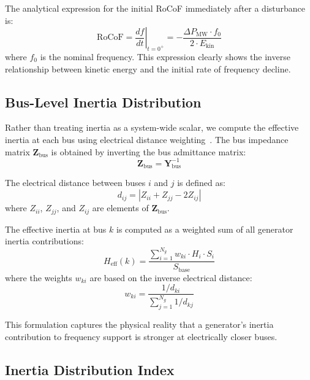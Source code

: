 \documentclass[]{ieeeaccess}
\begin{document}
The analytical expression for the initial RoCoF immediately after a disturbance is:
\begin{equation}
    \mathrm{RoCoF} = \left.\frac{df}{dt}\right|_{t=0^+} = -\frac{\Delta P_{\mathrm{MW}} \cdot f_0}{2 \cdot E_{\mathrm{kin}}}
    \label{eq:rocof}
\end{equation}
where $f_0$ is the nominal frequency. This expression clearly shows the inverse relationship between kinetic energy and the initial rate of frequency decline.

\subsection{Bus-Level Inertia Distribution}

Rather than treating inertia as a system-wide scalar, we compute the effective inertia at each bus using electrical distance weighting~\cite{tuo2021,li2024}. The bus impedance matrix $\mathbf{Z}_{\mathrm{bus}}$ is obtained by inverting the bus admittance matrix:
\begin{equation}
    \mathbf{Z}_{\mathrm{bus}} = \mathbf{Y}_{\mathrm{bus}}^{-1}
    \label{eq:zbus}
\end{equation}

The electrical distance between buses $i$ and $j$ is defined as:
\begin{equation}
    d_{ij} = |Z_{ii} + Z_{jj} - 2Z_{ij}|
    \label{eq:elec_dist}
\end{equation}
where $Z_{ii}$, $Z_{jj}$, and $Z_{ij}$ are elements of $\mathbf{Z}_{\mathrm{bus}}$.

The effective inertia at bus $k$ is computed as a weighted sum of all generator inertia contributions:
\begin{equation}
    H_{\mathrm{eff}}(k) = \frac{\displaystyle\sum_{i=1}^{N_g} w_{ki} \cdot H_i \cdot S_i}{S_{\mathrm{base}}}
    \label{eq:heff}
\end{equation}
where the weights $w_{ki}$ are based on the inverse electrical distance:
\begin{equation}
    w_{ki} = \frac{1/d_{ki}}{\displaystyle\sum_{j=1}^{N_g} 1/d_{kj}}
    \label{eq:weights}
\end{equation}

This formulation captures the physical reality that a generator's inertia contribution to frequency support is stronger at electrically closer buses.

\subsection{Inertia Distribution Index}
\end{document}
